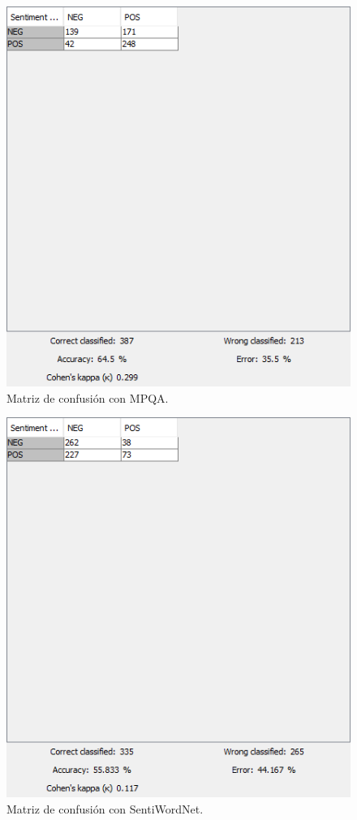 \begin{figure}[H]
    \center\includegraphics[width=.95\linewidth]{img/analysis/score1.png}
    \caption{Matriz de confusión con MPQA.}
\end{figure}

\begin{figure}[H]
    \center\includegraphics[width=.95\linewidth]{img/analysis/score2.png}
    \caption{Matriz de confusión con SentiWordNet.}
\end{figure}

